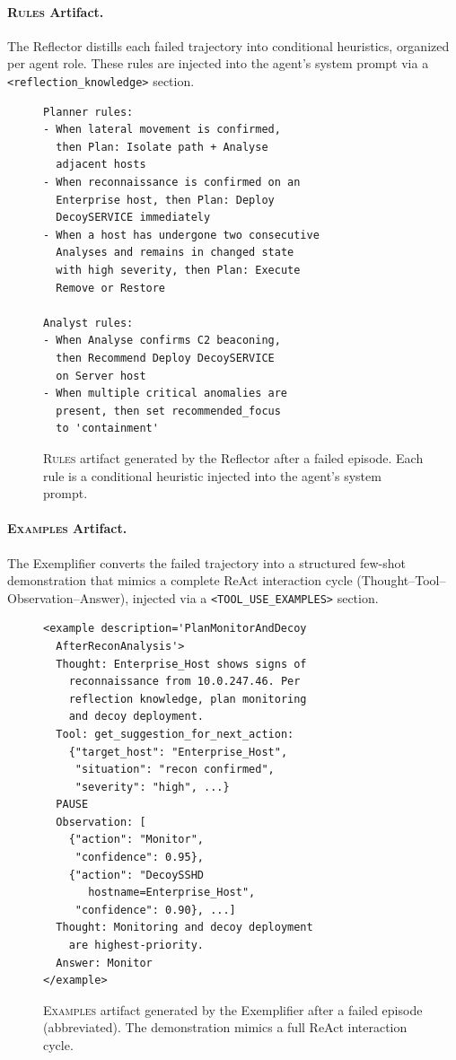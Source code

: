 \documentclass[sigconf]{acmart}
\begin{document}
\paragraph{\textsc{Rules} Artifact.}
The Reflector distills each failed trajectory into conditional heuristics, organized per agent role. These rules are injected into the agent's system prompt via a \texttt{<reflection\_knowledge>} section.
\begin{figure}[h!]
\footnotesize
\begin{verbatim}
Planner rules:
- When lateral movement is confirmed,
  then Plan: Isolate path + Analyse
  adjacent hosts
- When reconnaissance is confirmed on an
  Enterprise host, then Plan: Deploy
  DecoySERVICE immediately
- When a host has undergone two consecutive
  Analyses and remains in changed state
  with high severity, then Plan: Execute
  Remove or Restore

Analyst rules:
- When Analyse confirms C2 beaconing,
  then Recommend Deploy DecoySERVICE
  on Server host
- When multiple critical anomalies are
  present, then set recommended_focus
  to 'containment'
\end{verbatim}
\caption{\textsc{Rules} artifact generated by the Reflector after a failed episode. Each rule is a conditional heuristic injected into the agent's system prompt.}
\label{fig:artifact-rules}
\end{figure}

\paragraph{\textsc{Examples} Artifact.}
The Exemplifier converts the failed trajectory into a structured few-shot demonstration that mimics a complete ReAct interaction cycle (Thought--Tool--Observation--Answer), injected via a \texttt{<TOOL\_USE\_EXAMPLES>} section.
\begin{figure}[h!]
\footnotesize
\begin{verbatim}
<example description='PlanMonitorAndDecoy
  AfterReconAnalysis'>
  Thought: Enterprise_Host shows signs of
    reconnaissance from 10.0.247.46. Per
    reflection knowledge, plan monitoring
    and decoy deployment.
  Tool: get_suggestion_for_next_action:
    {"target_host": "Enterprise_Host",
     "situation": "recon confirmed",
     "severity": "high", ...}
  PAUSE
  Observation: [
    {"action": "Monitor",
     "confidence": 0.95},
    {"action": "DecoySSHD
       hostname=Enterprise_Host",
     "confidence": 0.90}, ...]
  Thought: Monitoring and decoy deployment
    are highest-priority.
  Answer: Monitor
</example>
\end{verbatim}
\caption{\textsc{Examples} artifact generated by the Exemplifier after a failed episode (abbreviated). The demonstration mimics a full ReAct interaction cycle.}
\label{fig:artifact-example}
\end{figure}
\end{document}
